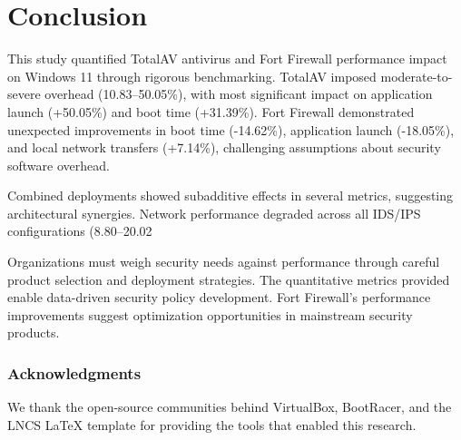 \documentclass[runningheads,a4paper,english]{llncs}[2022/01/12]
\begin{document}
\section{Conclusion}
\label{sec:conclusion}

This study quantified TotalAV antivirus and Fort Firewall performance impact on Windows 11 through rigorous benchmarking. TotalAV imposed moderate-to-severe overhead (10.83--50.05\%), with most significant impact on application launch (+50.05\%) and boot time (+31.39\%). Fort Firewall demonstrated unexpected improvements in boot time (-14.62\%), application launch (-18.05\%), and local network transfers (+7.14\%), challenging assumptions about security software overhead.

Combined deployments showed subadditive effects in several metrics, suggesting architectural synergies. Network performance degraded across all IDS/IPS configurations (8.80--20.02%

Organizations must weigh security needs against performance through careful product selection and deployment strategies.
The quantitative metrics provided enable data-driven security policy development.
Fort Firewall's performance improvements suggest optimization opportunities in mainstream security products.

\subsubsection*{Acknowledgments}
We thank the open-source communities behind VirtualBox, BootRacer, and the LNCS LaTeX template for providing the tools that enabled this research.



\end{document}
